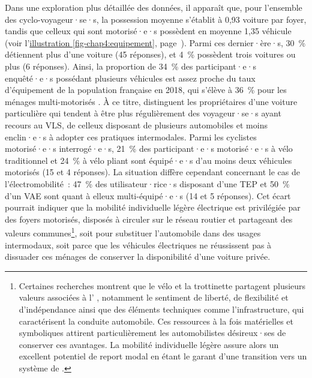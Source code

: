 \begin{refsegment}
Dans une exploration plus détaillée des données, il apparaît que, pour l'ensemble des cyclo-voyageur·se·s, la possession moyenne s'établit à 0,93 voiture par foyer, tandis que celleux qui sont motorisé·e·s possèdent en moyenne 1,35 véhicule (voir l'\hyperref[fig-chap4:equipement]{illustration \ref{fig-chap4:equipement}}, page~\pageref{fig-chap4:equipement}). Parmi ces dernier·ère·s, 30~\% détiennent plus d'une voiture (45 réponses), et 4~\% possèdent trois voitures ou plus (6 réponses). Ainsi, la proportion de 34~\% des participant·e·s enquêté·e·s possédant plusieurs véhicules est assez proche du taux d'équipement de la population française en 2018, qui s'élève à 36~\% pour les ménages multi-motorisés \textcolor{blue}{\autocite{insee_equipement_2020}}. À ce titre, \textcolor{blue}{\textcite[22]{cheng_expanding_2018}} distinguent les propriétaires d'une voiture particulière qui tendent à être plus régulièrement des voyageur·se·s ayant recours au \acrshort{VLS}, de celleux disposant de plusieurs automobiles et moins enclin·e·s à adopter ces pratiques intermodales. Parmi les cyclistes motorisé·e·s interrogé·e·s, 21~\% des participant·e·s motorisé·e·s à vélo traditionnel et 24~\% à vélo pliant sont équipé·e·s d'au moins deux véhicules motorisés (15 et 4 réponses). La situation diffère cependant concernant le cas de l'électromobilité~: 47~\% des utilisateur·rice·s disposant d'une \acrshort{TEP} et 50~\% d'un \acrshort{VAE} sont quant à elleux multi-équipé·e·s (14 et 5 réponses). Cet écart pourrait indiquer que la mobilité individuelle légère électrique est privilégiée par des foyers motorisés, disposés à circuler sur le réseau routier et partageant des valeurs communes\footnote{
    Certaines recherches montrent que le vélo et la trottinette partagent plusieurs valeurs associées à l' \textcolor{blue}{\autocites[57-58]{urry_sociology_2000}[28]{urry_system_2004}}, notamment le sentiment de liberté, de flexibilité et d'indépendance ainsi que des éléments techniques comme l'infrastructure, qui caractérisent la conduite automobile. Ces ressources à la fois matérielles et symboliques attirent particulièrement les automobilistes désireux·ses de conserver ces avantages. La mobilité individuelle légère assure alors un excellent potentiel de report modal en étant le garant d'une transition vers un système de  \textcolor{blue}{\autocite[492]{watson_how_2012}}.
}, soit pour substituer l'automobile dans des usages intermodaux, soit parce que les véhicules électriques ne réussissent pas à dissuader ces ménages de conserver la disponibilité d'une voiture privée.%


\end{refsegment}
